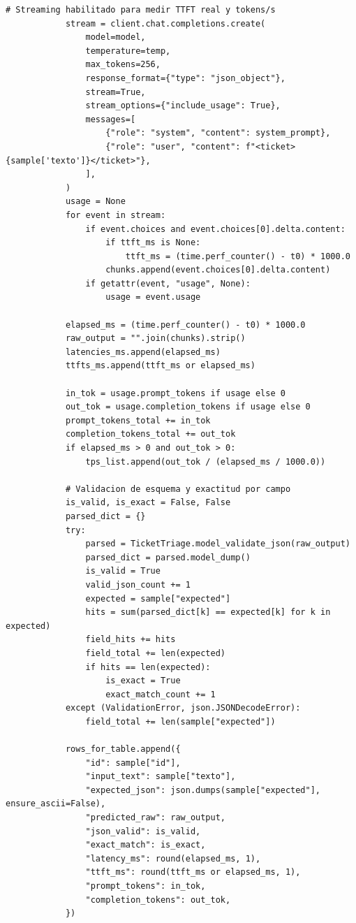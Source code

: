 \begin{lstlisting}[style=python, caption={Barrido sistemático de 3 plantillas $\times$ 2 temperaturas $\times$ 2 modelos registrado en MLflow Tracking.}, label={lst:prompt-sweep}]
            # Streaming habilitado para medir TTFT real y tokens/s
            stream = client.chat.completions.create(
                model=model,
                temperature=temp,
                max_tokens=256,
                response_format={"type": "json_object"},
                stream=True,
                stream_options={"include_usage": True},
                messages=[
                    {"role": "system", "content": system_prompt},
                    {"role": "user", "content": f"<ticket>{sample['texto']}</ticket>"},
                ],
            )
            usage = None
            for event in stream:
                if event.choices and event.choices[0].delta.content:
                    if ttft_ms is None:
                        ttft_ms = (time.perf_counter() - t0) * 1000.0
                    chunks.append(event.choices[0].delta.content)
                if getattr(event, "usage", None):
                    usage = event.usage

            elapsed_ms = (time.perf_counter() - t0) * 1000.0
            raw_output = "".join(chunks).strip()
            latencies_ms.append(elapsed_ms)
            ttfts_ms.append(ttft_ms or elapsed_ms)

            in_tok = usage.prompt_tokens if usage else 0
            out_tok = usage.completion_tokens if usage else 0
            prompt_tokens_total += in_tok
            completion_tokens_total += out_tok
            if elapsed_ms > 0 and out_tok > 0:
                tps_list.append(out_tok / (elapsed_ms / 1000.0))

            # Validacion de esquema y exactitud por campo
            is_valid, is_exact = False, False
            parsed_dict = {}
            try:
                parsed = TicketTriage.model_validate_json(raw_output)
                parsed_dict = parsed.model_dump()
                is_valid = True
                valid_json_count += 1
                expected = sample["expected"]
                hits = sum(parsed_dict[k] == expected[k] for k in expected)
                field_hits += hits
                field_total += len(expected)
                if hits == len(expected):
                    is_exact = True
                    exact_match_count += 1
            except (ValidationError, json.JSONDecodeError):
                field_total += len(sample["expected"])

            rows_for_table.append({
                "id": sample["id"],
                "input_text": sample["texto"],
                "expected_json": json.dumps(sample["expected"], ensure_ascii=False),
                "predicted_raw": raw_output,
                "json_valid": is_valid,
                "exact_match": is_exact,
                "latency_ms": round(elapsed_ms, 1),
                "ttft_ms": round(ttft_ms or elapsed_ms, 1),
                "prompt_tokens": in_tok,
                "completion_tokens": out_tok,
            })


\end{lstlisting}
